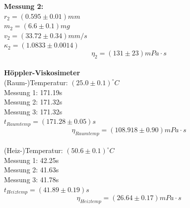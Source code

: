 \documentclass[12pt,a4paper]{article}
\begin{document}
\begin{multicols}{2}
\textbf{Messung 2:}\\
$r_2=(0.595 \pm 0.01)mm$\\
$m_2=(6.6 \pm 0.1)mg$\\
$v_2 = (33.72 \pm 0.34) mm/s$\\
$\kappa_2 = %
(1.0833 \pm 0.0014)$\\

$$\eta_2 = %
(131\pm 23) mPa\cdot s$$\\




\noindent
\textbf{Höppler-Viskosimeter}\\
(Raum-)Temperatur: $(25.0 \pm 0.1)^{\circ}C$\\
Messung 1: 171.19s\\
Messung 2: 171.32s\\
Messung 3: 171.32s\\
$t_{Raumtemp}= (171.28 \pm 0.05)s$\\
$$\eta_{Raumtemp}= (108.918\pm 0.90)mPa\cdot s$$
\\
(Heiz-)Temperatur: $(50.6\pm 0.1)^{\circ}C$\\
Messung 1: 42.25s\\
Messung 2: 41.63s\\
Messung 3: 41.78s\\
$t_{Heiztemp}= (41.89 \pm 0.19)s$\\
$$\eta_{Heiztemp}=(26.64\pm 0.17)mPa\cdot s$$


\end{multicols}
\end{document}
